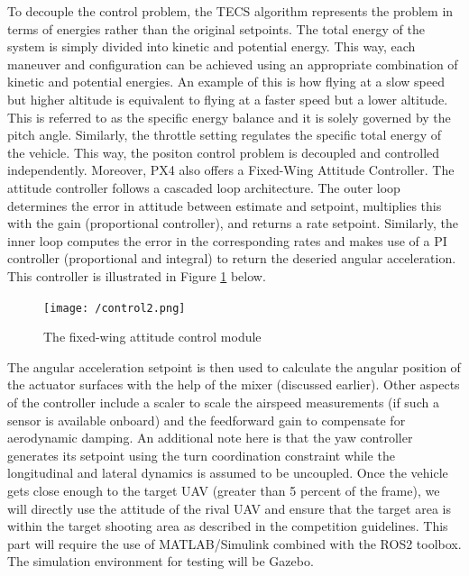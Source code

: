\documentclass[12pt]{article}
\begin{document}
\justify To decouple the control problem, the TECS algorithm represents the problem in terms of energies rather than the original setpoints. The total energy of the system is simply divided into kinetic and potential energy. This way, each maneuver and configuration can be achieved using an appropriate combination of kinetic and potential energies. An example of this is how flying at a slow speed but higher altitude is equivalent to flying at a faster speed but a lower altitude. This is referred to as the specific energy balance and it is solely governed by the pitch angle. Similarly, the throttle setting regulates the specific total energy of the vehicle. This way, the positon control problem is decoupled and controlled independently. 
\justify Moreover, PX4 also offers a Fixed-Wing Attitude Controller. The attitude controller follows a cascaded loop architecture. The outer loop determines the error in attitude between estimate and setpoint, multiplies this with the gain (proportional controller), and returns a rate setpoint. Similarly, the inner loop computes the error in the corresponding rates and makes use of a PI controller (proportional and integral) to return the deseried angular acceleration. This controller is illustrated in Figure \ref{fig:attitudecontrol} below.
\begin{figure}[ht]
 	\centering
 	\texttt{[image: /control2.png]}
 	\caption{The fixed-wing attitude control module}
        \label{fig:attitudecontrol}
 \end{figure}
\FloatBarrier
\justify The angular acceleration setpoint is then used to calculate the angular position of the actuator surfaces with the help of the mixer (discussed earlier). Other aspects of the controller include a scaler to scale the airspeed measurements (if such a sensor is available onboard) and the feedforward gain to compensate for aerodynamic damping. An additional note here is that the yaw controller generates its setpoint using the turn coordination constraint while the longitudinal and lateral dynamics is assumed to be uncoupled. 
\justify Once the vehicle gets close enough to the target UAV (greater than 5 percent of the frame), we will directly use the attitude of the rival UAV and ensure that the target area is within the target shooting area as described in the competition guidelines. This part will require the use of MATLAB/Simulink combined with the ROS2 toolbox. The simulation environment for testing will be Gazebo.
\end{document}
